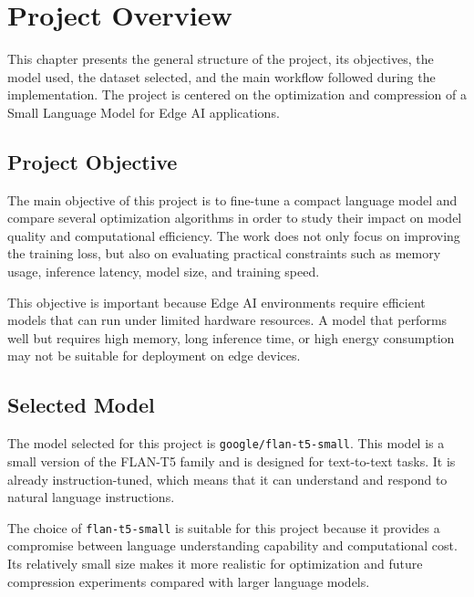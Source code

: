 \chapter{Project Overview}

\vspace*{0.3cm}

This chapter presents the general structure of the project, its objectives, the
model used, the dataset selected, and the main workflow followed during the
implementation. The project is centered on the optimization and compression of a
Small Language Model for Edge AI applications.

\section{Project Objective}

The main objective of this project is to fine-tune a compact language model and
compare several optimization algorithms in order to study their impact on model
quality and computational efficiency. The work does not only focus on improving
the training loss, but also on evaluating practical constraints such as memory
usage, inference latency, model size, and training speed.

\vspace*{0.15cm}

This objective is important because Edge AI environments require efficient models
that can run under limited hardware resources. A model that performs well but
requires high memory, long inference time, or high energy consumption may not be
suitable for deployment on edge devices.

\section{Selected Model}

The model selected for this project is \texttt{google/flan-t5-small}. This model
is a small version of the FLAN-T5 family and is designed for text-to-text tasks.
It is already instruction-tuned, which means that it can understand and respond to
natural language instructions.

\vspace*{0.15cm}

The choice of \texttt{flan-t5-small} is suitable for this project because it
provides a compromise between language understanding capability and computational
cost. Its relatively small size makes it more realistic for optimization and
future compression experiments compared with larger language models.

